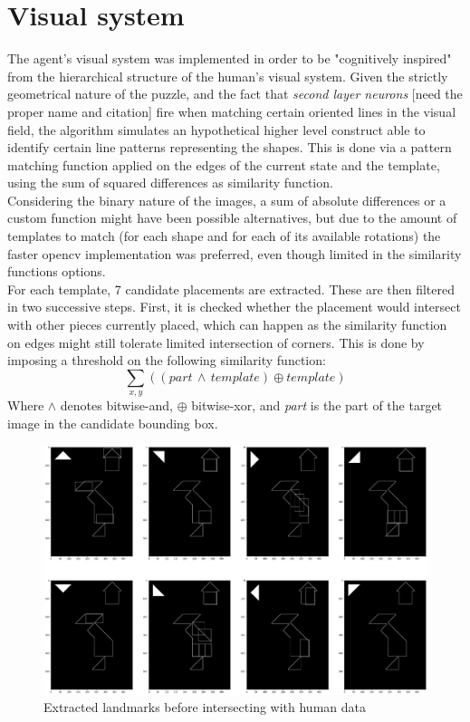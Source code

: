 \documentclass[a4paper,singleside,12pt]{report} %
\begin{document}
    \section{Visual system}
    The agent's visual system was implemented in order to be "cognitively inspired" from the
    hierarchical structure of the human's visual system. Given the strictly geometrical nature of
    the puzzle, and the fact that \textit{second layer neurons} [need the proper name and citation]
    fire when matching certain oriented lines in the visual field, the algorithm simulates an
    hypothetical higher level construct able to identify certain line patterns representing the
    shapes. This is done via a pattern matching function applied on the edges of the current state
    and the template, using the sum of squared differences as similarity function. \\ Considering
    the binary nature of the images, a sum of absolute differences or a custom function might have
    been possible alternatives, but due to the amount of templates to match (for each shape and for
    each of its available rotations) the faster opencv implementation was preferred, even though
    limited in the similarity functions options.\\
    For each template, 7 candidate placements are extracted. These are then filtered in two
    successive steps. First, it is checked whether the placement would intersect with other pieces
    currently placed, which can happen as the similarity function on edges might still tolerate
    limited intersection of corners. This is done by imposing a threshold on the following
    similarity function:
    \begin{equation}
        \sum_{x,y}((part\, \wedge \,template) \oplus template)
    \end{equation}
    Where \textit{$\wedge$} denotes bitwise-and, \textit{$\oplus$} bitwise-xor, and \textit{part} is
    the part of the target image in the candidate bounding box.\\
	\begin{figure}[h]
		\centering
		\includegraphics[scale=0.2]{pictures/extracted_no_intersect_1.png}
		\caption[]{Extracted landmarks before intersecting with human data}
		\label{fig:extracted_no_intersect_1}
	\end{figure}
\end{document}
